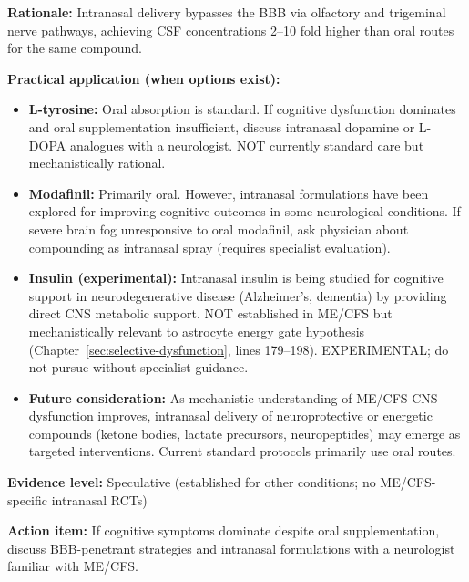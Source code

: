 \begin{recommendation}
\label{rec:intranasal-cns-delivery}

\textbf{Rationale:} Intranasal delivery bypasses the BBB via olfactory and trigeminal nerve pathways, achieving CSF concentrations 2--10 fold higher than oral routes for the same compound.

\textbf{Practical application (when options exist):}

\begin{itemize}
    \item \textbf{L-tyrosine:} Oral absorption is standard. If cognitive dysfunction dominates and oral supplementation insufficient, discuss intranasal dopamine or L-DOPA analogues with a neurologist. NOT currently standard care but mechanistically rational.

    \item \textbf{Modafinil:} Primarily oral. However, intranasal formulations have been explored for improving cognitive outcomes in some neurological conditions. If severe brain fog unresponsive to oral modafinil, ask physician about compounding as intranasal spray (requires specialist evaluation).

    \item \textbf{Insulin (experimental):} Intranasal insulin is being studied for cognitive support in neurodegenerative disease (Alzheimer's, dementia) by providing direct CNS metabolic support. NOT established in ME/CFS but mechanistically relevant to astrocyte energy gate hypothesis (Chapter~\ref{sec:selective-dysfunction}, lines 179--198). EXPERIMENTAL; do not pursue without specialist guidance.

    \item \textbf{Future consideration:} As mechanistic understanding of ME/CFS CNS dysfunction improves, intranasal delivery of neuroprotective or energetic compounds (ketone bodies, lactate precursors, neuropeptides) may emerge as targeted interventions. Current standard protocols primarily use oral routes.
\end{itemize}

\textbf{Evidence level:} Speculative (established for other conditions; no ME/CFS-specific intranasal RCTs)

\textbf{Action item:} If cognitive symptoms dominate despite oral supplementation, discuss BBB-penetrant strategies and intranasal formulations with a neurologist familiar with ME/CFS.

\end{recommendation}

